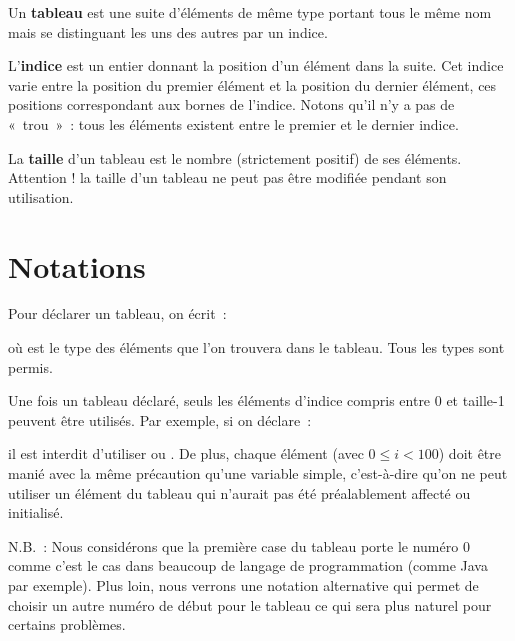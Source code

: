 		Un \textbf{tableau} est une suite d’éléments de même type 
		portant tous le même nom mais se distinguant 
		les uns des autres par un indice.
	
		L’\textbf{indice} est un entier 
		donnant la position d’un élément dans la suite. 
		Cet indice varie entre la position du premier élément 
		et la position du dernier élément, 
		ces positions correspondant aux bornes de l’indice.
		Notons qu'il n'y a pas de «~trou~»~: 
		tous les éléments existent entre le premier et le dernier indice.
	
		La \textbf{taille} d’un tableau 
		est le nombre (strictement positif) de ses éléments.
		Attention ! la taille d’un tableau ne peut pas être modifiée pendant
		son utilisation.
	
	\section{Notations}
	
		Pour déclarer un tableau, on écrit~:
	
		\begin{LDA}
		\end{LDA}
		
		où  est le type des éléments 
		que l’on trouvera dans le tableau.
		Tous les types sont permis. 
	
		Une fois un tableau déclaré, 
		seuls les éléments d’indice compris entre
		0 et taille-1 peuvent être utilisés. 
		Par exemple, si on déclare~:
	
		\begin{LDA}
		\Decl{tabEntiers}{\Array{100}{entiers}}
		\end{LDA}
		
		il est interdit d’utiliser  ou
		. 
		De plus, chaque élément
		 (avec $0 \leq i < 100$) 
		doit être manié avec la même précaution 
		qu’une variable simple, 
		c’est-à-dire qu’on ne peut utiliser un élément du tableau 
		qui n’aurait pas été préalablement affecté ou initialisé.
	
		N.B.~: Nous considérons que la première case du tableau
		porte le numéro 0 comme c'est le cas dans beaucoup de langage
		de programmation (comme Java par exemple).
		Plus loin, nous verrons une notation alternative
		qui permet de choisir un autre numéro de début pour le tableau
		ce qui sera plus naturel pour certains problèmes.

